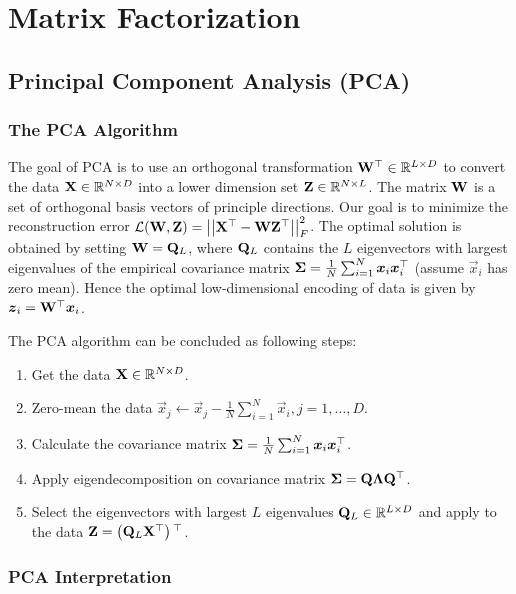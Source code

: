 
\chapter{Matrix Factorization}
\label{chapter4}



\section{Principal Component Analysis (PCA)}
\label{section4.1}

\subsection{The PCA Algorithm}

The goal of PCA is to use an orthogonal transformation $\mathbf{W}{}^\top\in\mathbb{R}^{L\times D}$ to convert the data $\mathbf{X}\in\mathbb{R}^{N\times D}$ into a lower dimension set $\mathbf{Z}\in\mathbb{R}^{N\times L}$. The matrix $\mathbf{W}$ is a set of orthogonal basis vectors of principle directions. Our goal is to minimize the reconstruction error $\mathcal{L}(\mathbf{W},\mathbf{Z})=\left\vert\left\vert \mathbf{X}{}^\top-\mathbf{W}\mathbf{Z}{}^\top \right\vert\right\vert_F^2$. The optimal solution is obtained by setting $\mathbf{W}=\mathbf{Q}_L$, where $\mathbf{Q}_L$ contains the $L$ eigenvectors with largest eigenvalues of the empirical covariance matrix $\mathbf{\Sigma}=\frac{1}{N}\sum_{i=1}^N\boldsymbol{x}_i\boldsymbol{x}_i^\top$ (assume $\vec{x}_i$ has zero mean). Hence the optimal low-dimensional encoding of data is given by $\boldsymbol{z}_i=\mathbf{W}{}^\top\boldsymbol{x}_i$.

The PCA algorithm can be concluded as following steps:
\begin{enumerate}
	\item Get the data $\mathbf{X}\in\mathbb{R}^{N\times D}$.
	\item Zero-mean the data $\vec{x}_j\gets\vec{x}_j-\frac{1}{N}\sum_{i=1}^N\vec{x}_i,j=1,\dotsc,D$.
	\item Calculate the covariance matrix $\mathbf{\Sigma}=\frac{1}{N}\sum_{i=1}^N\boldsymbol{x}_i\boldsymbol{x}_i^\top$.
	\item Apply eigendecomposition on covariance matrix $\mathbf{\Sigma}=\mathbf{Q}\mathbf{\Lambda}\mathbf{Q}{}^\top$.
	\item Select the eigenvectors with largest $L$ eigenvalues $\mathbf{Q}_L\in\mathbb{R}^{L\times D}$ and apply to the data $\mathbf{Z}=\left(\mathbf{Q}_L\mathbf{X}{}^\top\right){}^\top$.
\end{enumerate}

\subsection{PCA Interpretation}

